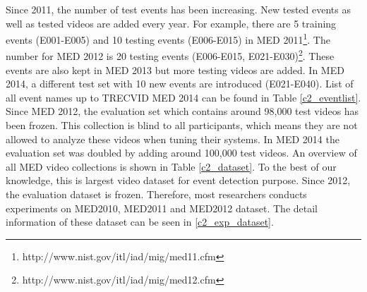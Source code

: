 Since 2011, the number of test events has been increasing. New tested events as well as tested videos are added every year. For example, there are 5 training events (E001-E005) and 10 testing events (E006-E015) in MED 2011\footnote{http://www.nist.gov/itl/iad/mig/med11.cfm}. The number for MED 2012 is 20 testing events (E006-E015, E021-E030)\footnote{http://www.nist.gov/itl/iad/mig/med12.cfm}. These events are also kept in MED 2013 but more testing videos are added. In MED 2014, a different test set with 10 new events are introduced (E021-E040). List of all event names up to TRECVID MED 2014 can be found in Table \ref{c2_eventlist}. Since MED 2012, the evaluation set which contains around 98,000 test videos has been frozen. This collection is blind to all participants, which means they are not allowed to analyze these videos when tuning their systems. 
In MED 2014 the evaluation set was doubled by adding around 100,000 test videos. An overview of all MED video collections is shown in Table \ref{c2_dataset}. To the best of our knowledge, this is largest video dataset for event detection purpose. Since 2012, the evaluation dataset is frozen. Therefore, most researchers conducts experiments on MED2010, MED2011 and MED2012 dataset. The detail information of these dataset can be seen in \ref{c2_exp_dataset}.

